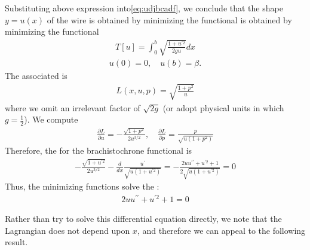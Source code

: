 \documentclass{article}
\begin{document}
 Substituting above expression into\cref{eq:udjbcadf}, we conclude that the shape $y = u(x)$ of the wire is obtained by minimizing the functional is obtained by minimizing the functional
\begin{align*}
T[u]=\int_{0}^{b} \sqrt{\frac{1+u^{\prime 2}}{2 g u}} d x
\end{align*}
\begin{align*}
u(0)=0, \quad u(b)=\beta .
\end{align*}
The associated  is 
\begin{align}
L(x, u, p)=\sqrt{\frac{1+p^{2}}{u}}\label{eq:fdadyrtrq}
\end{align}
where we omit an irrelevant factor of $\sqrt{2 g}$ (or adopt physical units in which $g=\frac{1}{2}$). We compute
\begin{align*}
\frac{\partial L}{\partial u}=-\frac{\sqrt{1+p^{2}}}{2 u^{3 / 2}}, \quad \frac{\partial L}{\partial p}=\frac{p}{\sqrt{u\left(1+p^{2}\right)}}
\end{align*}
Therefore, the  for the brachistochrone functional is
\begin{align*}
-\frac{\sqrt{1+u^{\prime 2}}}{2 u^{3 / 2}}-\frac{d}{d x} \frac{u^{\prime}}{\sqrt{u\left(1+u^{\prime 2}\right)}}=-\frac{2 u u^{\prime \prime}+u^{\prime 2}+1}{2 \sqrt{u\left(1+u^{\prime 2}\right)}}=0
\end{align*}
Thus, the minimizing functions solve the :
\begin{align*}
2 u u^{\prime \prime}+u^{\prime 2}+1=0
\end{align*}

Rather than try to solve this differential equation directly, we note that the Lagrangian does not depend upon $x$, and therefore we can appeal to the following result.
\end{document}

